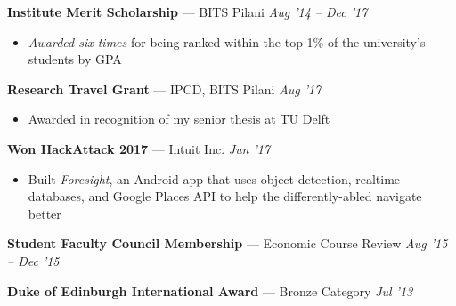 \documentclass[10pt]{article}
\newenvironment{innerlist}[1][\enskip\textbullet]%
        {\begin{itemize}[#1,leftmargin=*,parsep=0pt,itemsep=0pt,topsep=0pt,partopsep=0pt]}
        {\end{itemize}}
\newcommand{\halfblankline}{\quad\vspace{-0.5\baselineskip}\pagebreak[3]}
\begin{document}
\halfblankline

\textbf{Institute Merit Scholarship} --- BITS Pilani \hfill \emph{Aug '14 -- Dec '17}
\begin{innerlist}
\item[] \emph{Awarded six times} for being ranked within the top 1\% of the university's students by GPA
\end{innerlist}

\halfblankline

\textbf{Research Travel Grant} --- IPCD, BITS Pilani \hfill \emph{Aug '17}
\begin{innerlist}
\item[] Awarded in recognition of my senior thesis at TU Delft
\end{innerlist}
\halfblankline

\textbf{Won HackAttack 2017} --- Intuit Inc. \hfill \emph{Jun '17}
\begin{innerlist}
\item[] Built \textit{Foresight}, an Android app that uses object detection, realtime databases, and Google Places API to help the differently-abled navigate better
\end{innerlist}

\halfblankline

\textbf{Student Faculty Council Membership} --- Economic Course Review \hfill \emph{Aug '15 -- Dec '15}

\halfblankline

\textbf{Duke of Edinburgh International Award} --- Bronze Category \hfill \emph{Jul '13}
\end{document}
